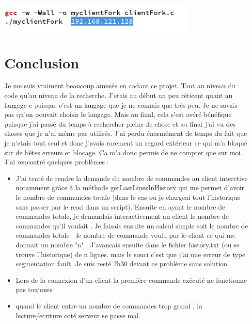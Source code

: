 \documentclass[a4paper,11pt]{report}
\begin{document}
\includegraphics[width=100mm]{../resources/adresseServeur.png}

\chapter{Conclusion}

Je me suis vraiment beaucoup amusés en codant ce projet. Tant au niveau du code qu'au niveau de la recherche. J'etais au début un peu réticent quant au langage c puisque c'est un langage que je ne connais que très peu. Je ne savais pas qu'on pouvait choisir le langage. Mais au final, cela s'est avéré bénéfique puisque j'ai passé du temps à rechercher pleins de chose et au final j'ai vu des choses que je n'ai même pas utilisés. 
J'ai perdu énormément de temps du fait que je n'etais tout seul et donc j'avais rarement un regard extérieur ce qui m'a bloqué sur de bêtes erreurs et blocage. Ca m'a donc permis de ne compter que sur moi.
J'ai rencontré quelques problèmes : 
\begin{itemize}
            \item J'ai tenté de rendre la demande du nombre de commandes au client interctive notamment grâce à la méthode getLastLinesInHistory qui me permet d'avoir le nombre de commandes totale (dans le cas ou je chargeai tout l'historique sans passer par le read dans un script). Ensuite en ayant le nombre de commandes totale, je demandais interactivement au client le nombre de commandes qu'il voulait . Je faisais ensuite un calcul simple soit le nombre de commandes totale - le nombre de commande voulu par le client ce qui me donnait un nombre "n" . J'avancais ensuite dans le fichier history.txt (ou se trouve l'historique) de n lignes. mais le souci c'est que j'ai une erreur de type segmentation fault. Je suis resté 2h30 devant ce problème sans solution.
	    \item  Lors de la connexion d'un client la première commande exécuté ne fonctionne pas toujours
	    \item quand le client entre un nombre de commandes trop grand , la lecture/ecriture coté serveur se passe mal.
\end{itemize}


 
\end{document}
